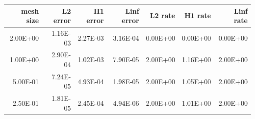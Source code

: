 \begin{tabular}{rrrrrrr}
\toprule
mesh size & L2 error & H1 error & Linf error & L2 rate & H1 rate & Linf rate \\
\midrule
2.00E+00 & 1.16E-03 & 2.27E-03 & 3.16E-04 & 0.00E+00 & 0.00E+00 & 0.00E+00 \\
1.00E+00 & 2.90E-04 & 1.02E-03 & 7.90E-05 & 2.00E+00 & 1.16E+00 & 2.00E+00 \\
5.00E-01 & 7.24E-05 & 4.93E-04 & 1.98E-05 & 2.00E+00 & 1.05E+00 & 2.00E+00 \\
2.50E-01 & 1.81E-05 & 2.45E-04 & 4.94E-06 & 2.00E+00 & 1.01E+00 & 2.00E+00 \\
\bottomrule
\end{tabular}
